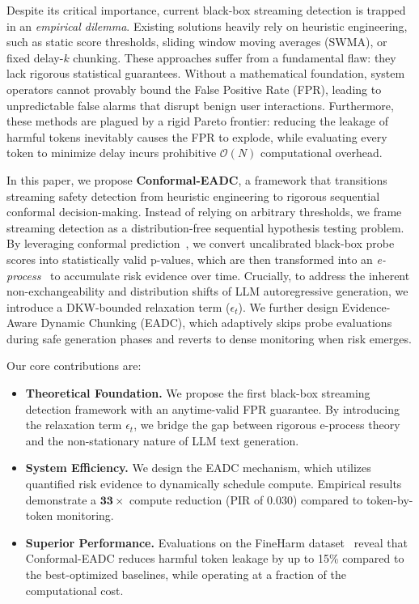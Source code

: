 \documentclass[letterpaper,twocolumn,10pt]{article}
\begin{document}
Despite its critical importance, current black-box streaming detection is trapped in an \emph{empirical dilemma}.
Existing solutions heavily rely on heuristic engineering, such as static score thresholds, sliding window moving averages (SWMA), or fixed delay-$k$ chunking.
These approaches suffer from a fundamental flaw: they lack rigorous statistical guarantees.
Without a mathematical foundation, system operators cannot provably bound the False Positive Rate (FPR), leading to unpredictable false alarms that disrupt benign user interactions.
Furthermore, these methods are plagued by a rigid Pareto frontier: reducing the leakage of harmful tokens inevitably causes the FPR to explode, while evaluating every token to minimize delay incurs prohibitive $\mathcal{O}(N)$ computational overhead.

In this paper, we propose \textbf{Conformal-EADC}, a framework that transitions streaming safety detection from heuristic engineering to rigorous sequential conformal decision-making.
Instead of relying on arbitrary thresholds, we frame streaming detection as a distribution-free sequential hypothesis testing problem.
By leveraging conformal prediction~\cite{vovk2005algorithmic}, we convert uncalibrated black-box probe scores into statistically valid p-values, which are then transformed into an \emph{e-process}~\cite{ramdas2023game} to accumulate risk evidence over time.
Crucially, to address the inherent non-exchangeability and distribution shifts of LLM autoregressive generation, we introduce a DKW-bounded relaxation term ($\epsilon_t$).
We further design Evidence-Aware Dynamic Chunking (EADC), which adaptively skips probe evaluations during safe generation phases and reverts to dense monitoring when risk emerges.

Our core contributions are:
\begin{itemize}
  \item \textbf{Theoretical Foundation.}
  We propose the first black-box streaming detection framework with an anytime-valid FPR guarantee.
  By introducing the relaxation term $\epsilon_t$, we bridge the gap between rigorous e-process theory and the non-stationary nature of LLM text generation.

  \item \textbf{System Efficiency.}
  We design the EADC mechanism, which utilizes quantified risk evidence to dynamically schedule compute.
  Empirical results demonstrate a $\mathbf{33\times}$ compute reduction (PIR of 0.030) compared to token-by-token monitoring.

  \item \textbf{Superior Performance.}
  Evaluations on the FineHarm dataset~\cite{fineharm2025} reveal that Conformal-EADC reduces harmful token leakage by up to 15\% compared to the best-optimized baselines, while operating at a fraction of the computational cost.
\end{itemize}
\end{document}
